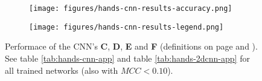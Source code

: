 \begin{figure}[h]
    \centering
    \begin{subfigure}{0.5\linewidth}
        \centering
        \captionsetup{width = 0.9\linewidth}
        \texttt{[image: figures/hands-cnn-results-accuracy.png]}
    \end{subfigure}%
    \begin{subfigure}{0.5\linewidth}
        \centering
        \captionsetup{width = 0.9\linewidth}
        \texttt{[image: figures/hands-cnn-results-legend.png]}
    \end{subfigure}%
    \caption{Performace of the CNN's \textbf{C}, \textbf{D}, \textbf{E} and \textbf{F} (definitions on page \pageref{itemize:1dCNNs} and ). See table \ref{tab:hands-cnn-app} and table \ref{tab:hands-2dcnn-app} for all trained networks (also with $MCC < 0.10$).}
    \label{fig:hands-cnn-results}
\end{figure}